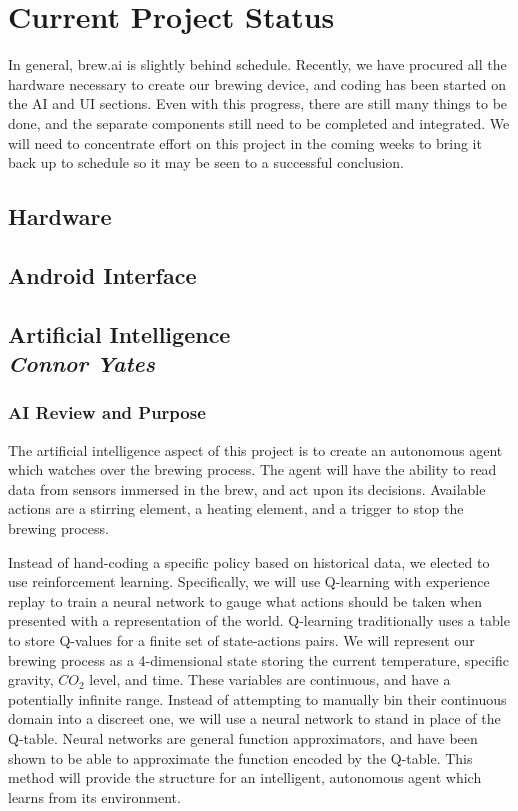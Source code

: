 \documentclass[draftclsnofoot,onecolumn,letterpaper,10pt]{IEEEtran}
\begin{document}
\section{Current Project Status}
In general, brew.ai is slightly behind schedule. Recently, we have procured all the hardware necessary to create our brewing device, and coding has been started on the AI and UI sections. Even with this progress, there are still many things to be done, and the separate components still need to be completed and integrated.
We will need to concentrate effort on this project in the coming weeks to bring it back up to schedule so it may be seen to a successful conclusion.

\subsection{Hardware}
\subsection{Android Interface}

\subsection{Artificial Intelligence\\{\em\textbf{Connor Yates}}}
\subsubsection{AI Review and Purpose}
The artificial intelligence aspect of this project is to create an autonomous agent which watches over the brewing process.
The agent will have the ability to read data from sensors immersed in the brew, and act upon its decisions.
Available actions are a stirring element, a heating element, and a trigger to stop the brewing process.

Instead of hand-coding a specific policy based on historical data, we elected to use reinforcement learning.
Specifically, we will use Q-learning with experience replay to train a neural network to gauge what actions should be taken when presented with a representation of the world.
Q-learning traditionally uses a table to store Q-values for a finite set of state-actions pairs.
We will represent our brewing process as a 4-dimensional state storing the current temperature, specific gravity, $CO_2$ level, and time.
These variables are continuous, and have a potentially infinite range.
Instead of attempting to manually bin their continuous domain into a discreet one, we will use a neural network to stand in place of the Q-table.
Neural networks are general function approximators, and have been shown to be able to approximate the function encoded by the Q-table.
This method will provide the structure for an intelligent, autonomous agent which learns from its environment.
\end{document}
